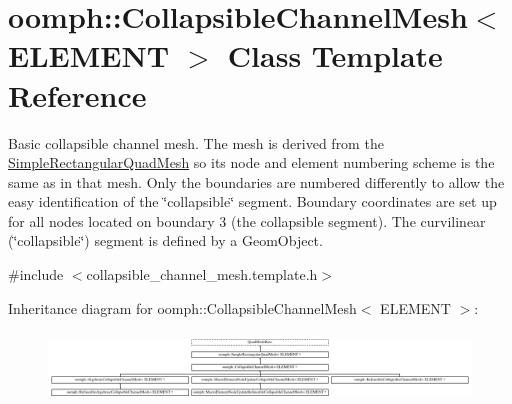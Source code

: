 \hypertarget{classoomph_1_1CollapsibleChannelMesh}{}\section{oomph\+:\+:Collapsible\+Channel\+Mesh$<$ E\+L\+E\+M\+E\+NT $>$ Class Template Reference}
\label{classoomph_1_1CollapsibleChannelMesh}


Basic collapsible channel mesh. The mesh is derived from the {\ttfamily \hyperlink{classoomph_1_1SimpleRectangularQuadMesh}{Simple\+Rectangular\+Quad\+Mesh}} so it\textquotesingle{}s node and element numbering scheme is the same as in that mesh. Only the boundaries are numbered differently to allow the easy identification of the \char`\"{}collapsible\char`\"{} segment. Boundary coordinates are set up for all nodes located on boundary 3 (the collapsible segment). The curvilinear (\char`\"{}collapsible\char`\"{}) segment is defined by a {\ttfamily Geom\+Object}.  




{\ttfamily \#include $<$collapsible\+\_\+channel\+\_\+mesh.\+template.\+h$>$}

Inheritance diagram for oomph\+:\+:Collapsible\+Channel\+Mesh$<$ E\+L\+E\+M\+E\+NT $>$\+:\begin{figure}[H]
\begin{center}
\leavevmode
\includegraphics[height=1.885522cm]{classoomph_1_1CollapsibleChannelMesh}
\end{center}
\end{figure}
